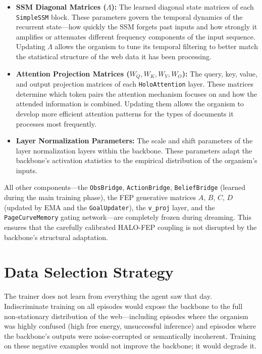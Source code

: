 \begin{itemize}
    \item \textbf{SSM Diagonal Matrices ($\Lambda$):} The learned diagonal state matrices of each \texttt{SimpleSSM} block. These parameters govern the temporal dynamics of the recurrent state---how quickly the SSM forgets past inputs and how strongly it amplifies or attenuates different frequency components of the input sequence. Updating $\Lambda$ allows the organism to tune its temporal filtering to better match the statistical structure of the web data it has been processing.

    \item \textbf{Attention Projection Matrices ($W_Q, W_K, W_V, W_O$):} The query, key, value, and output projection matrices of each \texttt{HoloAttention} layer. These matrices determine which token pairs the attention mechanism focuses on and how the attended information is combined. Updating them allows the organism to develop more efficient attention patterns for the types of documents it processes most frequently.

    \item \textbf{Layer Normalization Parameters:} The scale and shift parameters of the layer normalization layers within the backbone. These parameters adapt the backbone's activation statistics to the empirical distribution of the organism's inputs.
\end{itemize}

All other components---the \texttt{ObsBridge}, \texttt{ActionBridge}, \texttt{BeliefBridge} (learned during the main training phase), the FEP generative matrices $A$, $B$, $C$, $D$ (updated by EMA and the \texttt{GoalUpdater}), the \texttt{v\_proj} layer, and the \texttt{PageCurveMemory} gating network---are completely frozen during dreaming. This ensures that the carefully calibrated HALO-FEP coupling is not disrupted by the backbone's structural adaptation.

\section{Data Selection Strategy}

The trainer does not learn from everything the agent saw that day. Indiscriminate training on all episodes would expose the backbone to the full non-stationary distribution of the web---including episodes where the organism was highly confused (high free energy, unsuccessful inference) and episodes where the backbone's outputs were noise-corrupted or semantically incoherent. Training on these negative examples would not improve the backbone; it would degrade it.

